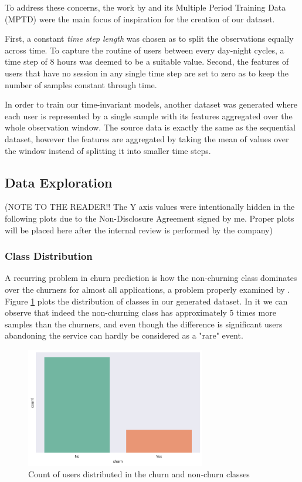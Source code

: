 \documentclass{kththesis}
\begin{document}
To address these concerns, the work by \citep{GurAli2014} and its Multiple Period Training Data (MPTD) were the main focus of inspiration for the creation of our dataset. 

First, a constant \emph{time step length} was chosen as to split the observations equally across time. To capture the routine of users between every day-night cycles, a time step of 8 hours was deemed to be a suitable value. Second, the features of users that have no session in any single time step are set to zero as to keep the number of samples constant through time. 

In order to train our time-invariant models, another dataset was generated where each user is represented by a single sample with its features aggregated over the whole observation window. The source data is exactly the same as the sequential dataset, however the features are aggregated by taking the mean of values over the window instead of splitting it into smaller time steps.

\subsection{Data Exploration}

(NOTE TO THE READER!! The Y axis values were intentionally hidden in the following plots due to the Non-Disclosure Agreement signed by me. Proper plots will be placed here after the internal review is performed by the company)

\subsubsection{Class Distribution}

A recurring problem in churn prediction is how the non-churning class dominates over the churners for almost all applications, a problem properly examined by \citep{Burez2009}. Figure \ref{fig:classdist} plots the distribution of classes in our generated dataset. In it we can observe that indeed the non-churning class has approximately 5 times more samples than the churners, and even though the difference is significant users abandoning the service can hardly be considered as a "rare" event.

	\begin{figure}[h]
    \centering
    \includegraphics[width=0.7\textwidth, natwidth=400bp, natheight=200bp]{figures/class_count.png}
    \caption{Count of users distributed in the churn and non-churn classes}
    \label{fig:classdist}
	\end{figure}
\end{document}
